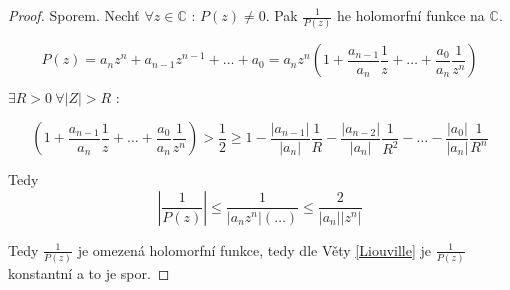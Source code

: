 \begin{proof}
Sporem. Nechť $\forall z \in \mathbb{C} \textrm{ : } P(z) \neq 0$. Pak $\frac{1}{P(z)}$ he holomorfní funkce na $\mathbb{C}$.

$$P(z) = a_n z^n + a_{n-1} z^{n-1} + \ldots + a_0 = a_n z^n \left( 1 + \frac{a_{n-1}}{a_n} \frac{1}{z} + \ldots + \frac{a_0}{a_n} \frac{1}{z^n} \right)$$

$\exists R > 0 \ \forall |Z| > R \textrm{ : }$

$$\left( 1 + \frac{a_{n-1}}{a_n} \frac{1}{z} + \ldots + \frac{a_0}{a_n} \frac{1}{z^n} \right) > \frac{1}{2} \geq 1 - \frac{|a_{n-1}|}{|a_n|} \frac{1}{R} - \frac{|a_{n-2}|}{|a_n|} \frac{1}{R^2} - \ldots - \frac{|a_0|}{|a_n|} \frac{1}{R^n}$$

Tedy 
$$\left| \frac{1}{P(z)} \right| \leq \frac{1}{|a_n z^n| (\ldots)} \leq \frac{2}{|a_n| |z^n|}$$

Tedy $\frac{1}{P(z)}$ je omezená holomorfní funkce, tedy dle Věty \ref{Liouville} je $\frac{1}{P(z)}$ konstantní a to je spor.
\end{proof}
